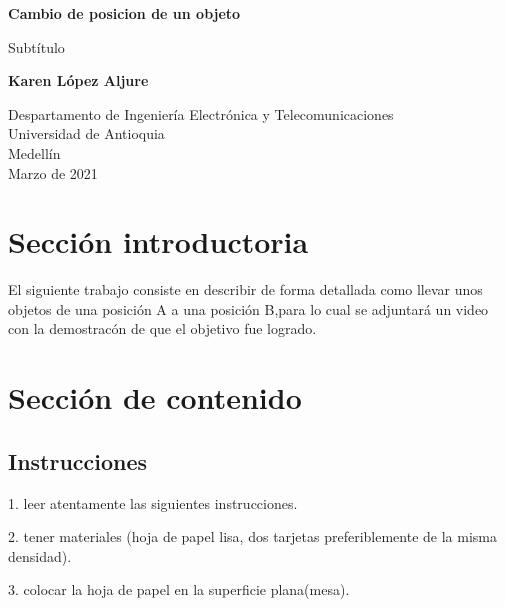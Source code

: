 \documentclass{article}
\begin{document}
\begin{titlepage}
    \begin{center}
        \vspace*{1cm}
            
        \Huge
        \textbf{Cambio de posicion de un objeto}
            
        \vspace{0.5cm}
        \LARGE
        Subtítulo
            
        \vspace{1.5cm}
            
        \textbf{Karen López Aljure}
            
        \vfill
            
        \vspace{0.8cm}
            
        \Large
        Despartamento de Ingeniería Electrónica y Telecomunicaciones\\
        Universidad de Antioquia\\
        Medellín\\
        Marzo de 2021
            
    \end{center}
\end{titlepage}

\tableofcontents
\newpage
\section{Sección introductoria}\label{intro}
El siguiente trabajo consiste en describir de forma detallada como llevar unos objetos de una posición A a una posición B,para lo cual se adjuntará un video con la demostracón de que el objetivo fue logrado.

\section{Sección de contenido} \label{contenido}

\subsection{Instrucciones}
1.	leer atentamente las siguientes instrucciones.

2.	tener materiales (hoja de papel lisa, dos tarjetas preferiblemente de la misma densidad).


3.	colocar la hoja de papel en la superficie plana(mesa).
\end{document}
